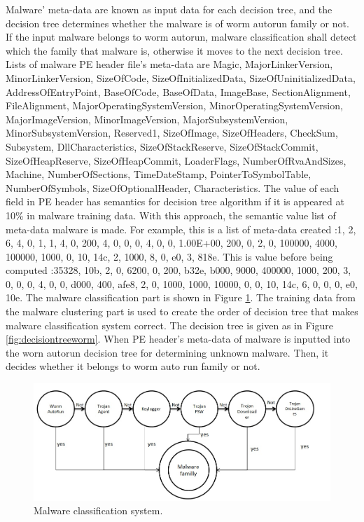 Malware' meta-data are known as input data for each decision tree, and the decision tree determines whether the malware is of worm autorun family or not. If the input malware belongs to worm autorun, malware classification shall detect which the family that malware is, otherwise it moves to the next decision tree. Lists of malware PE header file's meta-data are Magic, MajorLinkerVersion, MinorLinkerVersion, SizeOfCode, SizeOfInitializedData, SizeOfUninitializedData, AddressOfEntryPoint, BaseOfCode, BaseOfData, ImageBase, SectionAlignment, FileAlignment, MajorOperatingSystemVersion, MinorOperatingSystemVersion, MajorImageVersion, MinorImageVersion, MajorSubsystemVersion, MinorSubsystemVersion, Reserved1, SizeOfImage, SizeOfHeaders, CheckSum, Subsystem, DllCharacteristics, SizeOfStackReserve, SizeOfStackCommit, SizeOfHeapReserve, SizeOfHeapCommit, LoaderFlags, NumberOfRvaAndSizes, Machine, NumberOfSections, TimeDateStamp, PointerToSymbolTable, NumberOfSymbols, SizeOfOptionalHeader, Characteristics. The value of each field in PE header has semantics for decision tree algorithm if it is appeared at 10\% in malware training data. With this approach, the semantic value list of meta-data malware is made. For example, this is a list of meta-data created :1, 2, 6, 4, 0, 1, 1, 4, 0, 200, 4, 0, 0, 0, 4, 0, 0, 1.00E+00, 200, 0, 2, 0, 100000, 4000, 100000, 1000, 0, 10, 14c, 2, 1000, 8, 0, e0, 3, 818e. This is value before being computed :35328, 10b, 2, 0, 6200, 0, 200, b32e, b000, 9000, 400000, 1000, 200, 3, 0, 0, 0, 4, 0, 0, d000, 400, afe8, 2, 0, 1000, 1000, 10000, 0, 0, 10, 14c, 6, 0, 0, 0, e0, 10e. 
The malware classification part is shown in Figure \ref{fig:classification}. The training data from the malware clustering part is used to create the order of decision tree that makes malware classification system correct.
The decision tree is given as in Figure \ref{fig:decisiontreeworm}. When PE header's meta-data of malware is inputted into the worn autorun decision tree for determining unknown malware. Then, it decides whether it belongs to worm auto run family or not.\\
\begin{figure}[h!]
\centering
\includegraphics[width=1\textwidth]{graph/classification.jpg}
\caption{Malware classification system.}
\label{fig:classification}
\end{figure}

